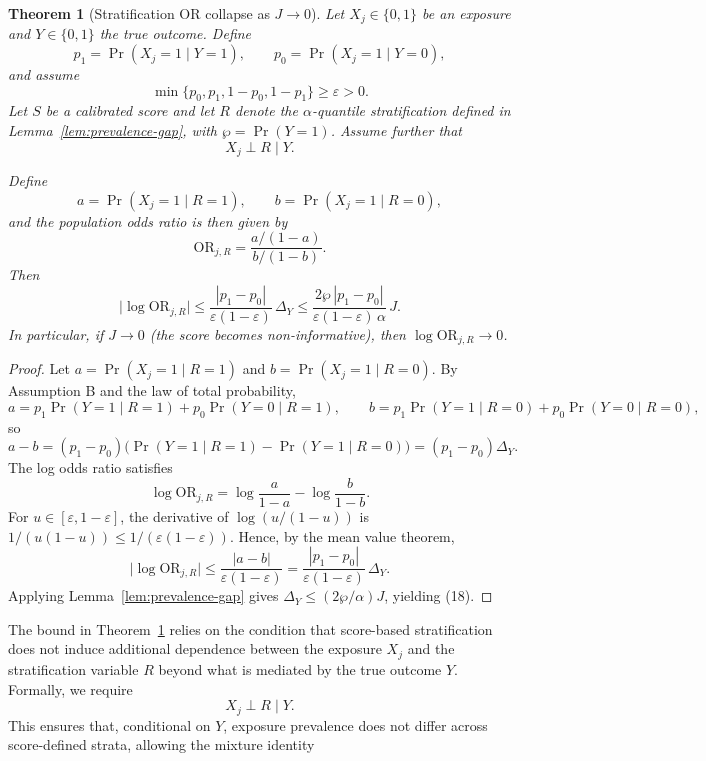 \documentclass[pdflatex,sn-mathphys-num]{sn-jnl}%
\theoremstyle{thmstyleone}%
\newtheorem{theorem}{Theorem}%
\theoremstyle{thmstyletwo}%
\theoremstyle{thmstylethree}%
\begin{document}
\begin{theorem}[Stratification OR collapse as $J \to 0$]\label{thm:SPOR_collapse_J}
Let $X_j\in\{0,1\}$ be an exposure and $Y\in\{0,1\}$ the true outcome.
Define
\[
p_1 = \Pr(X_j=1 \mid Y=1), 
\qquad 
p_0 = \Pr(X_j=1 \mid Y=0),
\]
and assume
\[
\min\{p_0,p_1,1-p_0,1-p_1\} \ge \varepsilon > 0.
\]
Let $S$ be a calibrated score and let $R$ denote the $\alpha$-quantile stratification
defined in Lemma~\ref{lem:prevalence-gap}, with $\wp = \Pr(Y=1)$.
Assume further that
\[
X_j \perp R \mid Y.
\]

Define
\[
a = \Pr(X_j=1 \mid R=1), 
\qquad 
b = \Pr(X_j=1 \mid R=0),
\]
and the population odds ratio is then given by
\[
\mathrm{OR}_{j,R}
=
\frac{a/(1-a)}{b/(1-b)}.
\]
Then
\[
\big|\log \mathrm{OR}_{j,R}\big|
\le
\frac{|p_1 - p_0|}{\varepsilon(1-\varepsilon)} \,\Delta_Y
\le
\frac{2\wp\,|p_1-p_0|}{\varepsilon(1-\varepsilon)\,\alpha}\,J.
\]
In particular, if $J \to 0$ (the score becomes non-informative), then
$\log \mathrm{OR}_{j,R} \to 0$.
\end{theorem}
%
\begin{proof}
Let \(a=\Pr(X_j{=}1\mid R{=}1)\) and \(b=\Pr(X_j{=}1\mid R{=}0)\). By Assumption B and the law of total probability,
\[
a=p_1\Pr(Y{=}1\mid R{=}1)+p_0\Pr(Y{=}0\mid R{=}1),\qquad
b=p_1\Pr(Y{=}1\mid R{=}0)+p_0\Pr(Y{=}0\mid R{=}0),
\]
so
\[
a-b=(p_1-p_0)\Big(\Pr(Y{=}1\mid R{=}1)-\Pr(Y{=}1\mid R{=}0)\Big)=(p_1-p_0)\Delta_Y.
\]
The log odds ratio satisfies
\[
\log\mathrm{OR}_{j,R}=\log\frac{a}{1-a}-\log\frac{b}{1-b}.
\]
For \(u\in[\varepsilon,1-\varepsilon]\), the derivative of \(\log(u/(1-u))\) is \(1/(u(1-u))\le 1/(\varepsilon(1-\varepsilon))\). Hence, by the mean value theorem,
\[
\Big|\log\mathrm{OR}_{j,R}\Big|\le \frac{|a-b|}{\varepsilon(1-\varepsilon)}=\frac{|p_1-p_0|}{\varepsilon(1-\varepsilon)}\,\Delta_Y.
\]
Applying Lemma~\ref{lem:prevalence-gap} gives \(\Delta_Y \le (2\wp/\alpha)J\), yielding (18).
\end{proof}
%
The bound in Theorem~\ref{thm:SPOR_collapse_J} relies on the condition that score-based stratification does not induce additional dependence between the exposure $X_j$ and the stratification variable $R$ beyond what is mediated by the true outcome $Y$. Formally, we require
\[
X_j \perp R \mid Y.
\]
This ensures that, conditional on $Y$, exposure prevalence does not differ across score-defined strata, allowing the mixture identity
\end{document}
